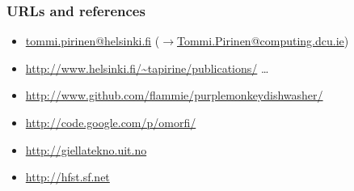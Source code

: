 \documentclass{beamer}
\begin{document}
\begin{frame}
    \frametitle{URLs and references}
    \begin{itemize}
        \item \url{tommi.pirinen@helsinki.fi} 
            ($\rightarrow$\url{Tommi.Pirinen@computing.dcu.ie})
        \item \url{http://www.helsinki.fi/~tapirine/publications/} \ldots
        \item \url{http://www.github.com/flammie/purplemonkeydishwasher/}
        \item \url{http://code.google.com/p/omorfi/}
        \item \url{http://giellatekno.uit.no}
        \item \url{http://hfst.sf.net}
    \end{itemize}
\end{frame}
\end{document}
